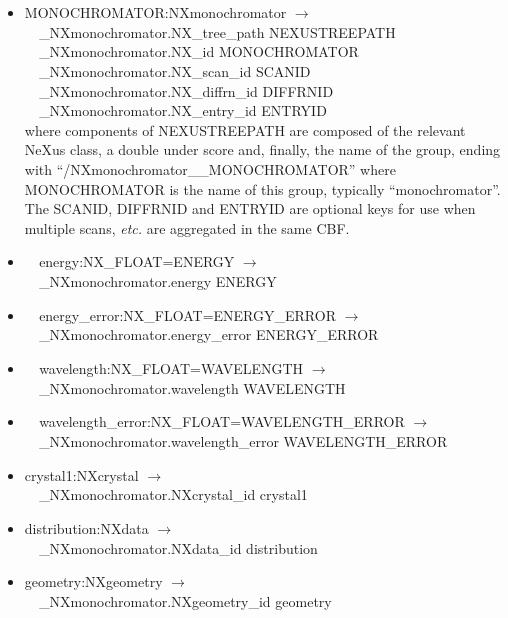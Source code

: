 \documentclass[11pt]{article}
\begin{document}
{{\begin{itemize}

\item{MONOCHROMATOR:NXmonochromator $\rightarrow$\\
\verb|  |\_NXmonochromator.NX\_tree\_path    NEXUSTREEPATH \\
\verb|  |\_NXmonochromator.NX\_id            MONOCHROMATOR\\
\verb|  |\_NXmonochromator.NX\_scan\_id      SCANID \\
\verb|  |\_NXmonochromator.NX\_diffrn\_id    DIFFRNID \\
\verb|  |\_NXmonochromator.NX\_entry\_id     ENTRYID \\
where components of NEXUSTREEPATH are composed of the
relevant NeXus class, a double under score and, finally, the
name of the group, ending with ``/NXmonochromator\_\_MONOCHROMATOR''
where MONOCHROMATOR is the name of this group, typically ``monochromator''.
The SCANID, DIFFRNID and ENTRYID are optional keys for use
when multiple scans, {\it etc.} are aggregated in the same CBF.}

\item{\verb|  |energy:NX\_FLOAT=ENERGY $\rightarrow$\\
\verb|  |\_NXmonochromator.energy ENERGY}

\item{\verb|  |energy\_error:NX\_FLOAT=ENERGY\_ERROR $\rightarrow$\\
\verb|  |\_NXmonochromator.energy\_error ENERGY\_ERROR}

\item{\verb|  |wavelength:NX\_FLOAT=WAVELENGTH $\rightarrow$\\
\verb|  |\_NXmonochromator.wavelength WAVELENGTH}

\item{\verb|  |wavelength\_error:NX\_FLOAT=WAVELENGTH\_ERROR $\rightarrow$\\
\verb|  |\_NXmonochromator.wavelength\_error WAVELENGTH\_ERROR}

\item{crystal1:NXcrystal $\rightarrow$\\
\verb|  |\_NXmonochromator.NXcrystal\_id crystal1}

\item{distribution:NXdata $\rightarrow$\\
\verb|  |\_NXmonochromator.NXdata\_id distribution}

\item{geometry:NXgeometry $\rightarrow$\\
\verb|  |\_NXmonochromator.NXgeometry\_id geometry}


\end{itemize}}}
\end{document}
